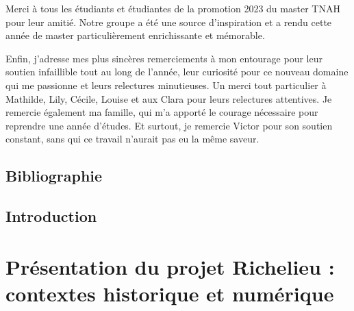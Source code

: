 \documentclass[openany, a4paper, 12pt, twoside]{book}
\begin{document}
Merci à tous les étudiants et étudiantes de la promotion 2023 du master TNAH pour leur amitié. Notre groupe a été une source d’inspiration et a rendu cette année de master particulièrement enrichissante et mémorable.

Enfin, j’adresse mes plus sincères remerciements à mon entourage pour leur soutien infaillible tout au long de l’année, leur curiosité pour ce nouveau domaine qui me passionne et leurs relectures minutieuses. Un merci tout particulier à Mathilde, Lily, Cécile, Louise et aux Clara pour leurs relectures attentives. Je remercie également ma famille, qui m’a apporté le courage nécessaire pour reprendre une année d’études. Et surtout, je remercie Victor pour son soutien constant, sans qui ce travail n’aurait pas eu la même saveur.

\newpage{\pagestyle{empty}\cleardoublepage}

\pagestyle{empty}
\chapter*{Bibliographie}
\printbibliography[keyword={timetravel}, title={Voyages dans le temps}]
\printbibliography[keyword={histoirequartier}, title={Histoire du quartier Richelieu}]
\printbibliography[keyword={dataviz}, title={Visualisation de données géospatiales}]
\printbibliography[keyword={technoweb}, title={Technologies du Web}]
\printbibliography[keyword={geohistoireartnumerique}, title={Géohistoire de l'art numérique}]


\chapter*{Introduction}
\pagestyle{empty}

\newpage{\pagestyle{empty}\cleardoublepage}
\mainmatter
\pagestyle{fancy}
\part[Présentation du projet Richelieu : contextes historique et numérique]{Présentation du projet Richelieu :\\ contextes historique et numérique}
\end{document}
